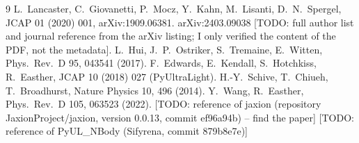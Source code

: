 \documentclass[11pt]{article}
\newcommand{\todo}[1]{{\color{red}[TODO: #1]}}
\begin{document}
\begin{thebibliography}{9}
 L.~Lancaster, C.~Giovanetti, P.~Mocz, Y.~Kahn, M.~Lisanti, D.~N.~Spergel, JCAP 01 (2020) 001, arXiv:1909.06381.
 arXiv:2403.09038 \todo{full author list and journal reference from the arXiv listing; I only verified the content of the PDF, not the metadata}.
 L.~Hui, J.~P.~Ostriker, S.~Tremaine, E.~Witten, Phys.\ Rev.\ D 95, 043541 (2017).
 F.~Edwards, E.~Kendall, S.~Hotchkiss, R.~Easther, JCAP 10 (2018) 027 (PyUltraLight).
 H.-Y.~Schive, T.~Chiueh, T.~Broadhurst, Nature Physics 10, 496 (2014).
 Y.~Wang, R.~Easther, Phys.\ Rev.\ D 105, 063523 (2022).
 \todo{reference of jaxion (repository JaxionProject/jaxion, version 0.0.13, commit ef96a94b) -- find the paper}
 \todo{reference of PyUL\_NBody (Sifyrena, commit 879b8e7e)}
\end{thebibliography}
\end{document}
